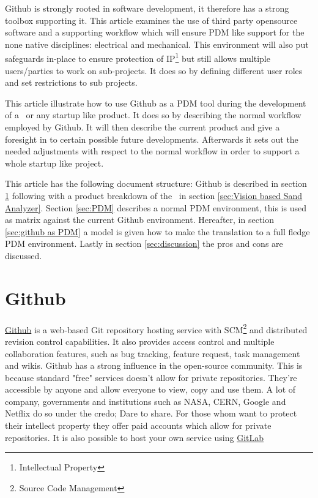 \documentclass[fleqn,10pt]{SelfArx} %
\begin{document}
Github is strongly rooted in software development, it therefore has a strong toolbox supporting it. This article examines the use of third party opensource software and a supporting workflow which will ensure PDM like support for the none native disciplines: electrical and mechanical. This environment will also put safeguards in-place to ensure protection of IP\footnote{Intellectual Property} but still allows multiple users/parties to work on sub-projects. It does so by defining different user roles and set restrictions to sub projects.

This article illustrate how to use Github as a PDM tool during the development of a \vsa \ or any startup like product. It does so by describing the normal workflow employed by Github. It will then describe the current product and give a foresight in to certain possible future developments. Afterwards it sets out the needed adjustments with respect to the normal workflow in order to support a whole startup like project.

This article has the following document structure: Github is described in section \ref{sec:Github} following with a product breakdown of the \vsa \ in section \ref{sec:Vision based Sand Analyzer}. Section \ref{sec:PDM} describes a normal PDM environment, this is used as matrix against the current Github environment. Hereafter, in section \ref{sec:github as PDM} a model is given how to make the translation to a full fledge PDM environment. Lastly in section \ref{sec:discussion} the pros and cons are discussed.

\section{Github}\label{sec:Github}
\href{https://github.com/}{\color{color1}Github} is a web-based Git repository hosting service with SCM\footnote{Source Code Management} and distributed revision control capabilities. It also provides access control and multiple collaboration features, such as bug tracking, feature request, task management and wikis. Github has a strong influence in the open-source community. This is because standard "free" services doesn't allow for private repositories. They're accessible by anyone and allow everyone to view, copy and use them. A lot of company, governments and institutions such as NASA, CERN, Google and Netflix do so under the credo; Dare to share. 
For those whom want to protect their intellect property they offer paid accounts which allow for private repositories. It is also possible to host your own service using \href{https://about.gitlab.com/}{\color{color1}GitLab} 
\end{document}
